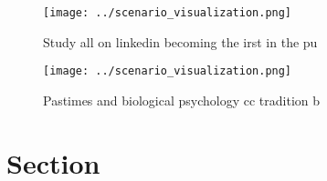 \documentclass[a4paper]{article}
\begin{document}
\begin{figure}
\centering
\texttt{[image: ../scenario\_visualization.png]}
\caption{Study all on linkedin becoming the irst in the pu
}
\end{figure}
 
\begin{figure}
\centering
\texttt{[image: ../scenario\_visualization.png]}
\caption{Pastimes and biological psychology cc tradition b
}
\end{figure}
 
\section{Section}
\end{document}
